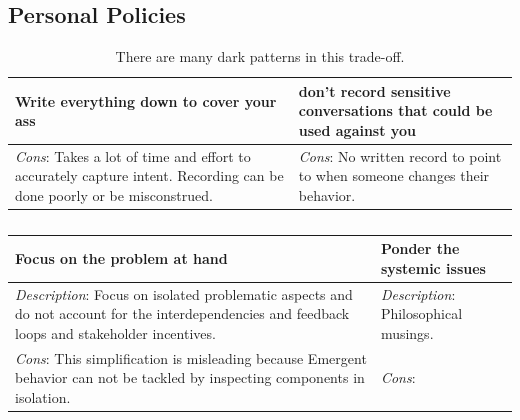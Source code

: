 \subsection{Personal Policies}

\begin{center}
\begin{table}[ht]
\begin{tabular}{ | m{\dilemmatablewidth}| m{\dilemmatablewidth} | } 
  \hline
  \textbf{Write everything down to cover your ass} &
  \textbf{don't record sensitive conversations that could be used against you} \\
  \hline
  \textit{Cons}: Takes a lot of time and effort to accurately capture intent. Recording can be done poorly or be misconstrued.  & 
  \textit{Cons}: No written record to point to when someone changes their behavior. \\
  \hline
\end{tabular}
\caption{There are many dark patterns in this trade-off.}
\label{table:notes_or_no_notes}
\end{table}
\end{center}


\begin{center}
\begin{table}[ht]
\begin{tabular}{ | m{\dilemmatablewidth}| m{\dilemmatablewidth} | } 
  \hline
  \textbf{Focus on the problem at hand} &
  \textbf{Ponder the systemic issues} \\
  \hline
  \textit{Description}: Focus on isolated problematic aspects and do not account for the interdependencies and feedback loops and stakeholder incentives. &
  \textit{Description}: Philosophical musings. \\
  \hline
  \textit{Cons}: This simplification is misleading because Emergent behavior can not be tackled by inspecting components in isolation. & 
  \textit{Cons}: \\
  \hline
\end{tabular}
\caption{
}
\label{table:focus-vs-systemic}
\end{table}
\end{center}

